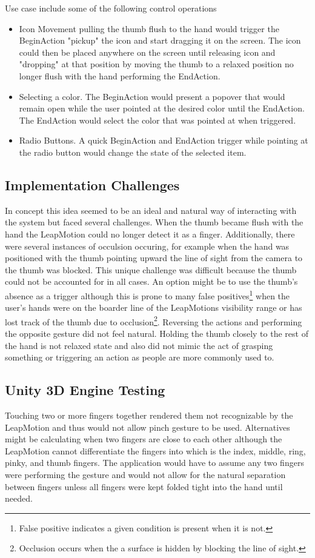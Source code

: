 Use case include some of the following control operations

\begin{itemize}
\item Icon Movement pulling the thumb flush to the hand would trigger the BeginAction "pickup" the icon and start dragging it on the screen. The icon could then be placed anywhere on the screen until releasing icon and "dropping" at that position by moving the thumb to a relaxed position no longer flush with the hand performing the EndAction.
\item Selecting a color. The BeginAction would present a popover that would remain open while the user pointed at the desired color until the EndAction. The EndAction would select the color that was pointed at when triggered. 
\item Radio Buttons. A quick BeginAction and EndAction trigger while pointing at the radio button would change the state of the selected item. 
\end{itemize}

\subsection{Implementation Challenges}
In concept this idea seemed to be an ideal and natural way of interacting with the system but faced several challenges. When the thumb became flush with the hand the LeapMotion could no longer detect it as a finger. Additionally, there were several instances of occulsion occuring, for example when the hand was positioned with the thumb pointing upward the line of sight from the camera to the thumb was blocked. This unique challenge was difficult because the thumb could not be accounted for in all cases. An option might be to use the thumb's absence as a trigger although this is prone to many false positives\footnote{False positive indicates a given condition is present when it is not.} when the user's hands were on the boarder line of the LeapMotions visibility range or has lost track of the thumb due to occlusion\footnote{Occlusion occurs when the a surface is hidden by blocking the line of sight.}. Reversing the actions and performing the opposite gesture did not feel natural. Holding the thumb closely to the rest of the hand is not relaxed state and also did not mimic the act of grasping something or triggering an action as people are more commonly used to. 


\subsection{Unity 3D Engine Testing}
Touching two or more fingers together rendered them not recognizable by the LeapMotion and thus would not allow pinch gesture to be used. Alternatives might be calculating when two fingers are close to each other although the LeapMotion cannot differentiate the fingers into which is the index, middle, ring, pinky, and thumb fingers. The application would have to assume any two fingers were performing the gesture and would not allow for the natural separation between fingers unless all fingers were kept folded tight into the hand until needed. 

